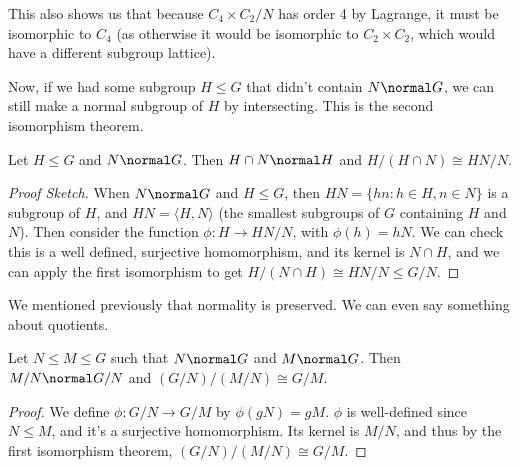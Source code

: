 \documentclass[a4]{scrreprt}
\begin{document}
\begin{example}
\begin{center}


	\end{center}
	This also shows us that because $C_4 \times C_2 / N$ has order 4 by Lagrange, it must be isomorphic to $C_4$ (as otherwise it would be isomorphic to $C_2 \times C_2$, which would have a different subgroup lattice).
\end{example}

Now, if we had some subgroup $H \leq G$ that didn't contain $N \normal G$, we can still make a normal subgroup of $H$ by intersecting. This is the second isomorphism theorem.

\begin{theorem}
	Let $H \leq G$ and $N \normal G$. Then $H \cap N \normal H$ and $H/(H \cap N) \cong HN / N$.
\end{theorem}
\begin{proof}[Proof Sketch]
	When $N \normal G$ and $H \leq G$, then $HN = \{ hn : h \in H, n \in N\}$ is a subgroup of $H$, and $HN = \langle H, N \rangle$ (the smallest subgroups of $G$ containing $H$ and $N$). Then consider the function $\phi : H \rightarrow HN/N$, with $\phi(h) = hN$. We can check this is a well defined, surjective homomorphism, and its kernel is $N \cap H$, and we can apply the first isomorphism to get $H/(N \cap H) \cong HN/N \leq G/N$.
\end{proof}

We mentioned previously that normality is preserved. We can even say something about quotients.

\begin{theorem}
	Let $N \leq M \leq G$ such that $N \normal G$ and $M \normal G$. Then $M/N \normal G/N$ and $(G/N) / (M/N) \cong G/M$.
\end{theorem}
\begin{proof}
	We define $\phi: G/N \rightarrow G/M$ by $\phi(gN) = gM$. $\phi$ is well-defined since $N \leq M$, and it's a surjective homomorphism. Its kernel is $M/N$, and thus by the first isomorphism theorem, $(G/N) / (M/N) \cong G/M$.
\end{proof}
\end{document}
